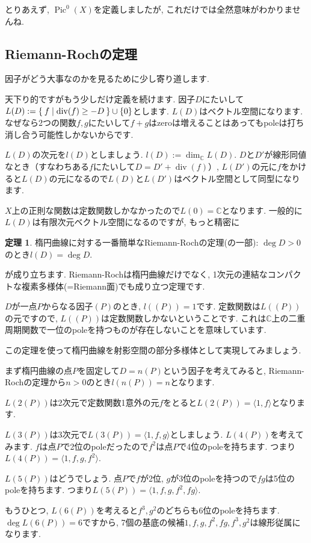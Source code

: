 \documentclass{jsarticle}
\newcommand{\CC}{\mathbb{C}}
\newcommand{\makeop}[1]{\mathop{\mathrm{#1}}\nolimits}
\def\Pic{\makeop{Pic}}
\def\div{\makeop{div}}
\theoremstyle{definition}
\newtheorem{theorem}{定理}
\numberwithin{theorem}{section}
\begin{document}
とりあえず, $\Pic^0(X)$を定義しましたが, これだけでは全然意味がわかりませんね.

\subsection{Riemann-Rochの定理}
因子がどう大事なのかを見るために少し寄り道します.

天下り的ですがもう少しだけ定義を続けます. 因子$D$にたいして$L(D) := \Set{f | \div(f) \geq -D} \cup \{0\}$とします. $L(D)$はベクトル空間になります. なぜなら2つの関数$f, g$にたいして$f+g$はzeroは増えることはあってもpoleは打ち消し合う可能性しかないからです.

$L(D)$の次元を$l(D)$としましょう. $l(D) := \dim_\CC L(D)$. $D$と$D'$が線形同値なとき（すなわちある$f$にたいして$D = D' + \div(f)$）, $L(D')$の元に$f$をかけると$L(D)$の元になるので$L(D)$と$L(D')$はベクトル空間として同型になります.

$X$上の正則な関数は定数関数しかなかったので$L(0) = \CC$となります. 一般的に$L(D)$は有限次元ベクトル空間になるのですが, もっと精密に
\begin{theorem}
楕円曲線に対する一番簡単なRiemann-Rochの定理(の一部): $\deg D > 0$のとき$l(D) = \deg D$.
\end{theorem}
が成り立ちます. Riemann-Rochは楕円曲線だけでなく, 1次元の連結なコンパクトな複素多様体(=Riemann面)でも成り立つ定理です.

$D$が一点$P$からなる因子$(P)$のとき, $l((P)) = 1$です. 定数関数は$L((P))$の元ですので, $L((P))$は定数関数しかないということです. これは$\CC$上の二重周期関数で一位のpoleを持つものが存在しないことを意味しています.

この定理を使って楕円曲線を射影空間の部分多様体として実現してみましょう.

まず楕円曲線の点$P$を固定して$D = n(P)$という因子を考えてみると, Riemann-Rochの定理から$n > 0$のとき$l(n(P)) = n$となります.

$L(2(P))$は2次元で定数関数1意外の元$f$をとると$L(2(P)) = \langle1, f\rangle$となります.

$L(3(P))$は3次元で$L(3(P)) = \langle1, f, g\rangle$としましょう. $L(4(P))$を考えてみます. $f$は点$P$で2位のpoleだったので$f^2$は点$P$で4位のpoleを持ちます. つまり$L(4(P)) = \langle1, f, g, f^2\rangle$.

$L(5(P))$はどうでしょう. 点$P$で$f$が2位, $g$が3位のpoleを持つので$fg$は5位のpoleを持ちます. つまり$L(5(P)) = \langle1, f, g, f^2, fg\rangle$.

もうひとつ, $L(6(P))$を考えると$f^3, g^2$のどちらも6位のpoleを持ちます. $\deg L(6(P)) = 6$ですから, 7個の基底の候補$1, f, g, f^2, fg, f^3, g^2$は線形従属になります.
\end{document}
